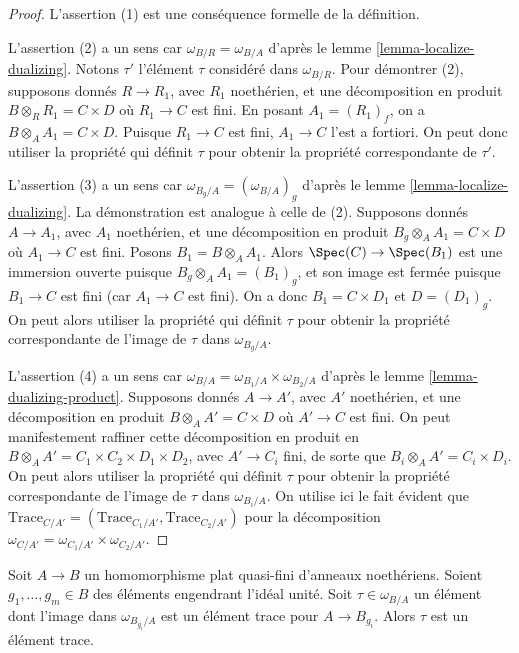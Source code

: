 \begin{proof}
L'assertion (1) est une conséquence formelle de la définition.

\medskip\noindent
L'assertion (2) a un sens car $\omega_{B/R} = \omega_{B/A}$
d'après le lemme \ref{lemma-localize-dualizing}. Notons $\tau'$ l'élément
$\tau$ considéré dans $\omega_{B/R}$. Pour démontrer (2),
supposons donnés $R \to R_1$, avec $R_1$ noethérien, et une décomposition
en produit $B \otimes_R R_1 = C \times D$ où $R_1 \to C$ est fini.
En posant $A_1 = (R_1)_f$, on a $B \otimes_A A_1 = C \times D$.
Puisque $R_1 \to C$ est fini, $A_1 \to C$ l'est a fortiori.
On peut donc utiliser la propriété qui définit $\tau$ pour obtenir la propriété
correspondante de $\tau'$.

\medskip\noindent
L'assertion (3) a un sens car $\omega_{B_g/A} = (\omega_{B/A})_g$
d'après le lemme \ref{lemma-localize-dualizing}. La démonstration est analogue à celle
de (2). Supposons donnés $A \to A_1$, avec $A_1$ noethérien, et
une décomposition en produit $B_g \otimes_A A_1 = C \times D$ où $A_1 \to C$
est fini. Posons $B_1 = B \otimes_A A_1$. Alors
$\Spec(C) \to \Spec(B_1)$ est une immersion ouverte puisque $B_g \otimes_A A_1 = (B_1)_g$,
et son image est fermée puisque $B_1 \to C$ est fini
(car $A_1 \to C$ est fini).
On a donc $B_1 = C \times D_1$ et $D = (D_1)_g$. On peut alors utiliser
la propriété qui définit $\tau$ pour obtenir la propriété correspondante
de l'image de $\tau$ dans $\omega_{B_g/A}$.

\medskip\noindent
L'assertion (4) a un sens car
$\omega_{B/A} = \omega_{B_1/A} \times \omega_{B_2/A}$ d'après le
lemme \ref{lemma-dualizing-product}.
Supposons donnés $A \to A'$, avec $A'$ noethérien, et
une décomposition en produit $B \otimes_A A' = C \times D$ où $A' \to C$
est fini. On peut manifestement raffiner cette décomposition
en produit en $B \otimes_A A' = C_1 \times C_2 \times D_1 \times D_2$,
avec $A' \to C_i$ fini, de sorte que $B_i \otimes_A A' = C_i \times D_i$.
On peut alors utiliser la propriété qui définit $\tau$ pour obtenir la propriété
correspondante de l'image de $\tau$ dans $\omega_{B_i/A}$. On utilise ici le fait évident
que
$\text{Trace}_{C/A'} = (\text{Trace}_{C_1/A'}, \text{Trace}_{C_2/A'})$
pour la décomposition
$\omega_{C/A'} = \omega_{C_1/A'} \times \omega_{C_2/A'}$.
\end{proof}

\begin{lemma}
\label{lemma-glue-trace}
Soit $A \to B$ un homomorphisme plat quasi-fini d'anneaux noethériens.
Soient $g_1, \ldots, g_m \in B$ des éléments engendrant l'idéal unité.
Soit $\tau \in \omega_{B/A}$ un élément dont l'image dans
$\omega_{B_{g_i}/A}$ est un élément trace pour $A \to B_{g_i}$.
Alors $\tau$ est un élément trace.
\end{lemma}

